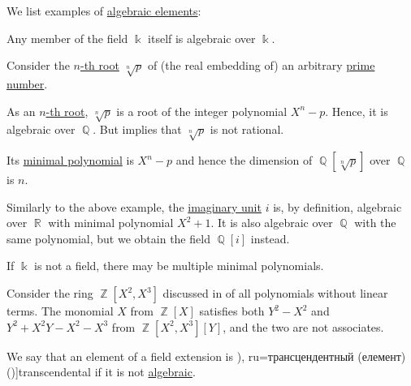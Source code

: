 \begin{example}\label{ex:def:algebraic_element}
  We list examples of \hyperref[def:algebraic_element]{algebraic elements}:
  \begin{thmenum}
     Any member of the field \( \Bbbk \) itself is algebraic over \( \Bbbk \).

     Consider the \hyperref[def:principal_nonnegative_nth_root]{\( n \)-th root} \( \sqrt[n]{ p } \) of (the real embedding of) an arbitrary \hyperref[def:prime_number]{prime number}.

    As an \hyperref[def:nth_root]{\( n \)-th root}, \( \sqrt[n]{ p } \) is a root of the integer polynomial \( X^n - p \). Hence, it is algebraic over \( \BbbQ \). But  implies that \( \sqrt[n]{ p } \) is not rational.

    Its \hyperref[def:algebraic_element_minimal_polynomial]{minimal polynomial} is \( X^n - p \) and hence the dimension of \( \BbbQ[\sqrt[n]{ p }] \) over \( \BbbQ \) is \( n \).

     Similarly to the above example, the \hyperref[def:complex_numbers]{imaginary unit} \( i \) is, by definition, algebraic over \( \BbbR \) with minimal polynomial \( X^2 + 1 \). It is also algebraic over \( \BbbQ \) with the same polynomial, but we obtain the field \( \BbbQ[i] \) instead.

     If \( \Bbbk \) is not a field, there may be multiple minimal polynomials.

    Consider the ring \( \BbbZ[X^2, X^3] \) discussed in  of all polynomials without linear terms. The monomial \( X \) from \( \BbbZ[X] \) satisfies both \( Y^2 - X^2 \) and \( Y^2 + X^2Y - X^2 - X^3 \) from \( \BbbZ[X^2, X^3][Y] \), and the two are not associates.
  \end{thmenum}
\end{example}

\begin{definition}\label{def:transcendental_element}
  We say that an element of a field extension is \term[bg=трансцендентен (елемент) (\cite[423]{Обрешков1962ВисшаАлгебра}), ru=трансцендентный (елемент) (\cite[407]{Винберг2014Алгебра})]{transcendental} if it is not \hyperref[def:algebraic_element]{algebraic}.
\end{definition}

